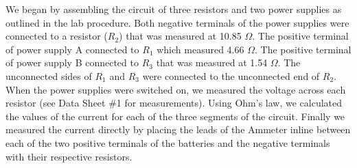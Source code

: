
We began by assembling the circuit of three resistors and two power supplies as outlined in the lab procedure.  Both negative terminals of the power supplies were connected to a resistor ($R_2$) that was measured at 10.85 $\Omega$.  The positive terminal of power supply A connected to $R_1$ which measured 4.66 $\Omega$.  The positive terminal of power supply B connected to $R_3$ that was measured at 1.54 $\Omega$.  The unconnected sides of $R_1$ and $R_3$ were connected to the unconnected end of $R_2$.  When the power supplies were switched on, we measured the voltage across each resistor (see Data Sheet \#1 for measurements).  Using Ohm's law, we calculated the values of the current for each of the three segments of the circuit.  Finally we measured the current directly by placing the leads of the Ammeter inline between each of the two positive terminals of the batteries and the negative terminals with their respective resistors.